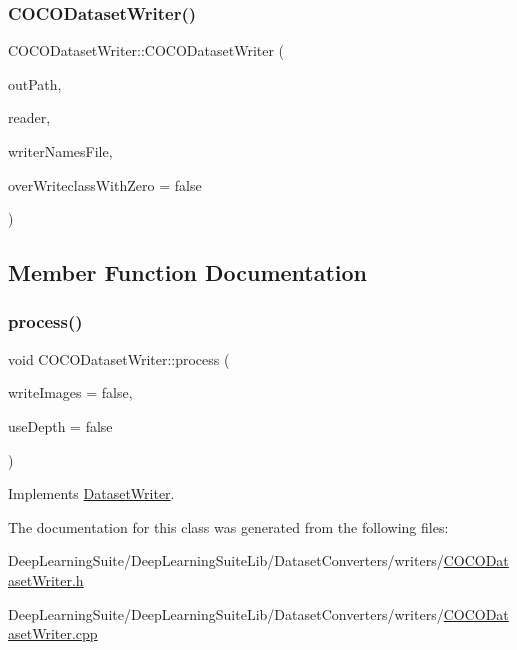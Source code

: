 \subsubsection{\texorpdfstring{C\+O\+C\+O\+Dataset\+Writer()}{COCODatasetWriter()}}
{\footnotesize\ttfamily C\+O\+C\+O\+Dataset\+Writer\+::\+C\+O\+C\+O\+Dataset\+Writer (\begin{DoxyParamCaption}\item[{const std\+::string \&}]{out\+Path,  }\item[{\hyperlink{_dataset_reader_8h_a30d89cba514a220d64d04535c0465f1c}{Dataset\+Reader\+Ptr} \&}]{reader,  }\item[{const std\+::string \&}]{writer\+Names\+File,  }\item[{bool}]{over\+Writeclass\+With\+Zero = {\ttfamily false} }\end{DoxyParamCaption})}



\subsection{Member Function Documentation}
\mbox{\label{class_c_o_c_o_dataset_writer_a82b054ee143507382ae3f87b46c246d6}} 
\subsubsection{\texorpdfstring{process()}{process()}}
{\footnotesize\ttfamily void C\+O\+C\+O\+Dataset\+Writer\+::process (\begin{DoxyParamCaption}\item[{bool}]{write\+Images = {\ttfamily false},  }\item[{bool}]{use\+Depth = {\ttfamily false} }\end{DoxyParamCaption})\hspace{0.3cm}{\ttfamily [virtual]}}



Implements \hyperlink{class_dataset_writer_a97270b2e182e6c08d9342d8db42710fd}{Dataset\+Writer}.



The documentation for this class was generated from the following files\+:\begin{DoxyCompactItemize}
\item 
Deep\+Learning\+Suite/\+Deep\+Learning\+Suite\+Lib/\+Dataset\+Converters/writers/\hyperlink{_c_o_c_o_dataset_writer_8h}{C\+O\+C\+O\+Dataset\+Writer.\+h}\item 
Deep\+Learning\+Suite/\+Deep\+Learning\+Suite\+Lib/\+Dataset\+Converters/writers/\hyperlink{_c_o_c_o_dataset_writer_8cpp}{C\+O\+C\+O\+Dataset\+Writer.\+cpp}\end{DoxyCompactItemize}
